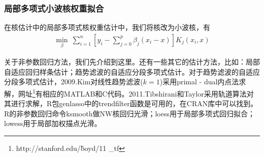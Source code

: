         \subsubsection{局部多项式小波核权重拟合}
            \par
            在核估计中的局部多项式核权重估计中，我们将核改为小波核，有
            \begin{align*}
            \min_\beta \ \sum_{i=1}^n\left[y_i - \sum_{j=0}^p\beta_j(x_i - x)\right] K_j(x_i,x)
            \end{align*}
            \par
            关于非参数回归方法，我们先介绍到这里。还有一些其它的估计方法，比如：局部自适应回归样条估计；趋势滤波的自适应分段多项式估计。对于趋势滤波的自适应分段多项式估计，2009.Kim对线性趋势滤波($k=1$)采用primal - dual内点法求解，网址\footnote{http://stanford.edu/\~boyd/11
            \_tf}有相应的MATLAB和C代码。2011.Tibshirani和Taylor采用轨道算法对其进行求解，R包genlasso中的trendfilter函数是可用的，在CRAN库中可以找到。R的非参数回归命令ksmooth做NW核回归光滑；loess用于局部多项式回归拟合；lowess用于局部加权描点光滑。



% 
